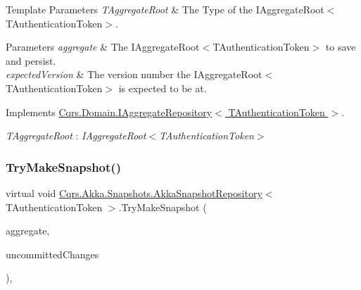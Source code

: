 \begin{DoxyTemplParams}{Template Parameters}
{\em T\+Aggregate\+Root} & The Type of the I\+Aggregate\+Root$<$\+T\+Authentication\+Token$>$.\\
\hline
\end{DoxyTemplParams}

\begin{DoxyParams}{Parameters}
{\em aggregate} & The I\+Aggregate\+Root$<$\+T\+Authentication\+Token$>$ to save and persist.\\
\hline
{\em expected\+Version} & The version number the I\+Aggregate\+Root$<$\+T\+Authentication\+Token$>$ is expected to be at.\\
\hline
\end{DoxyParams}


Implements \hyperlink{interfaceCqrs_1_1Domain_1_1IAggregateRepository_a306baf8aa6faabe893f93e5db5d3517d_a306baf8aa6faabe893f93e5db5d3517d}{Cqrs.\+Domain.\+I\+Aggregate\+Repository$<$ T\+Authentication\+Token $>$}.

\begin{Desc}
\item[Type Constraints]\begin{description}
\item[{\em T\+Aggregate\+Root} : {\em I\+Aggregate\+Root$<$T\+Authentication\+Token$>$}]\end{description}
\end{Desc}
\mbox{\label{classCqrs_1_1Akka_1_1Snapshots_1_1AkkaSnapshotRepository_ae9df38e7f69f1cae3c080fcf8a998a18_ae9df38e7f69f1cae3c080fcf8a998a18}} 
\subsubsection{\texorpdfstring{Try\+Make\+Snapshot()}{TryMakeSnapshot()}}
{\footnotesize\ttfamily virtual void \hyperlink{classCqrs_1_1Akka_1_1Snapshots_1_1AkkaSnapshotRepository}{Cqrs.\+Akka.\+Snapshots.\+Akka\+Snapshot\+Repository}$<$ T\+Authentication\+Token $>$.Try\+Make\+Snapshot (\begin{DoxyParamCaption}\item[{\hyperlink{interfaceCqrs_1_1Domain_1_1IAggregateRoot}{I\+Aggregate\+Root}$<$ T\+Authentication\+Token $>$}]{aggregate,  }\item[{I\+Enumerable$<$ \hyperlink{interfaceCqrs_1_1Events_1_1IEvent}{I\+Event}$<$ T\+Authentication\+Token $>$$>$}]{uncommitted\+Changes }\end{DoxyParamCaption})\hspace{0.3cm}{\ttfamily [protected]}, {\ttfamily [virtual]}}



